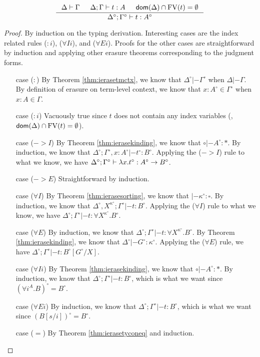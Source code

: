 \begin{theorem}
\label{thm:ierasetypingifree}
\[ \inference{ \Delta |- \Gamma & \Delta;\Gamma |- t : A
             & \dom(\Delta)\cap\FV(t) = \emptyset}
		{\Delta^\circ;\Gamma^\circ |- t : A^\circ}
\]
\end{theorem}
\begin{proof} By induction on the typing derivation.
	Interesting cases are the index related rules ($:i$), ($\forall Ii$),
	and ($\forall Ei$). Proofs for the other cases are straightforward
	by induction and applying other erasure theorems corresponding to
	the judgment forms.
\begin{itemize}
\item[case] ($:$)
	By Theorem \ref{thm:ierasetmctx}, we know that
	$\Delta^\circ|- \Gamma^\circ$ when $\Delta|- \Gamma$.
	By definition of erasure on term-level context, we know that
	$x:A^\circ \in \Gamma^\circ$ when $x:A \in \Gamma$.
\item[case] ($:i$)
	Vacuously true since $t$ does not contain any index variables
        (\ie, $\mathop{\mathsf{dom}}(\Delta)\cap\mathop{\mathrm{FV}}(t) = \emptyset$).
\item[case] ($->$$I$)
	By Theorem \ref{thm:ierasekinding}, we know that $\circ |- A^\circ:*$.
	By induction, we know that
	$\Delta^\circ;\Gamma^\circ,x:A^\circ |- t^\circ : B^\circ$.
	Applying the ($->$$I$) rule to what we know, we have
	$\Delta^\circ;\Gamma^\circ |- \lambda x.t^\circ : A^\circ -> B^\circ$.
\item[case] ($->$$E$)
	Straightforward by induction.
\item[case] ($\forall I$)
	By Theorem \ref{thm:ierasesorting}, we know that
	$|- \kappa^\circ:\square$.
	By induction, we know that
	$\Delta^\circ,X^{\kappa^\circ};\Gamma^\circ |- t : B^\circ$.
	Applying the ($\forall I$) rule to what we know, we have
	$\Delta^\circ;\Gamma^\circ |- t : \forall X^{\kappa^\circ}.B^\circ$.
\item[case] ($\forall E$)
	By induction, we know that
	$\Delta^\circ;\Gamma^\circ |- t : \forall X^{\kappa^\circ}.B^\circ$.
	By Theorem \ref{thm:ierasekinding}, we know that
	$\Delta^\circ |- G^\circ : \kappa^\circ$.
	Applying the ($\forall E$) rule, we have
	$\Delta^\circ;\Gamma^\circ |- t : B^\circ[G^\circ / X]$.
\item[case] ($\forall Ii$)
	By Theorem \ref{thm:ierasekinding}, we know that $\circ |- A^\circ:*$.
	By induction, we know that $\Delta^\circ;\Gamma^\circ |- t : B^\circ$,
	which is what we want since $(\forall i^A.B)^\circ = B^\circ$.
\item[case] ($\forall Ei$)
	By induction, we know that $\Delta^\circ;\Gamma^\circ |- t : B^\circ$,
	which is what we want since $(B[s/i])^\circ = B^\circ$.
\item[case] ($=$)
	By Theorem \ref{thm:ierasetyconeq} and induction.
\end{itemize}\vspace*{-10pt}
\end{proof}

